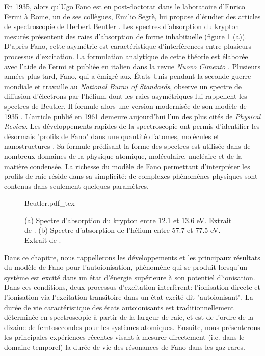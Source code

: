 En 1935, alors qu'Ugo Fano est en post-doctorat dans le laboratoire d'Enrico Fermi à Rome, un de ses collègues, Emilio Segrè, lui propose d'étudier des articles de spectroscopie de Herbert Beutler . Les spectres d'absorption du krypton mesurés présentent des raies d'absorption de forme inhabituelle (figure \ref{fig:Beutler} (a)). D'après Fano, cette asymétrie est caractéristique d'interférences entre plusieurs processus d'excitation. La formulation analytique de cette théorie est élaborée avec l'aide de Fermi et publiée en italien dans la revue \textit{Nuovo Cimento} . Plusieurs années plus tard, Fano, qui a émigré aux \'{E}tats-Unis pendant la seconde guerre mondiale et travaille au \textit{National Burau of Standards}, observe un spectre de diffusion d'électrons par l'hélium dont les raies asymétriques lui rappellent les spectres de Beutler. Il formule alors une version modernisée de son modèle de 1935 . L'article publié en 1961 demeure aujourd'hui l'un des plus cités de \textit{Physical Review}. Les développements rapides de la spectroscopie ont permis d'identifier les désormais "profils de Fano" dans une quantité d'atomes, molécules et nanostructures . Sa formule prédisant la forme des spectres est utilisée dans de nombreux domaines de la physique atomique, moléculaire, nucléaire et de la matière condensée. La richesse du modèle de Fano permettant d'interpréter les profils de raie réside dans sa simplicité: de complexes phénomènes physiques sont contenus dans seulement quelques paramètres.

\begin{figure}
\centering
\def\svgwidth{\textwidth}
{Beutler.pdf_tex}
\caption{(a) Spectre d'absorption du krypton entre 12.1 et 13.6 eV. Extrait de . (b) Spectre d'absorption de l'hélium entre 57.7 et 77.5 eV. Extrait de .}
\label{fig:Beutler}
\end{figure}

Dans ce chapitre, nous rappellerons les développements et les principaux résultats du modèle de Fano pour l'autoionisation, phénomène qui se produit lorsqu'un système est excité dans un état d'énergie supérieure à son potentiel d'ionisation. Dans ces conditions, deux processus d'excitation interfèrent: l'ionisation directe et l'ionisation via l'excitation transitoire dans un état excité dit "autoionisant". La durée de vie caractéristique des états autoionisants est traditionnellement déterminée en spectroscopie à partir de la largeur de raie, et est de l'ordre de la dizaine de femtosecondes pour les systèmes atomiques. Ensuite, nous présenterons les principales expériences récentes visant à mesurer directement (i.e. dans le domaine temporel) la durée de vie des résonances de Fano dans les gaz rares.


